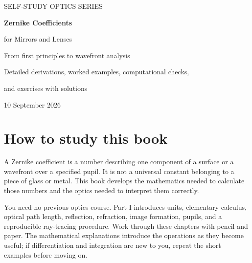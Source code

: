 \documentclass[11pt,a4paper,oneside,openany]{book}
\begin{document}
\frontmatter
\hypersetup{pageanchor=false}
\begin{titlepage}
\centering
\vspace*{18mm}
{\large SELF-STUDY OPTICS SERIES\par}
\vspace{17mm}
{\Huge\bfseries Zernike Coefficients\par}
\vspace{5mm}
{\LARGE for Mirrors and Lenses\par}
\vspace{13mm}
{\Large From first principles to wavefront analysis\par}
\vspace{14mm}
\vfill
{\large Detailed derivations, worked examples, computational checks,\par and exercises with solutions\par}
\vspace{8mm}
{10 September 2026\par}
\end{titlepage}
\hypersetup{pageanchor=true}
\setcounter{page}{1}
\chapter*{How to study this book}
A Zernike coefficient is a number describing one component of a surface or a wavefront over a specified pupil. It is not a universal constant belonging to a piece of glass or metal. This book develops the mathematics needed to calculate those numbers and the optics needed to interpret them correctly.

You need no previous optics course. Part I introduces units, elementary calculus, optical path length, reflection, refraction, image formation, pupils, and a reproducible ray-tracing procedure. Work through these chapters with pencil and paper. The mathematical explanations introduce the operations as they become useful; if differentiation and integration are new to you, repeat the short examples before moving on.
\end{document}
